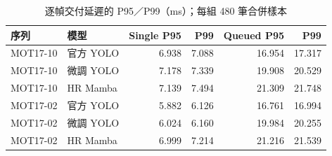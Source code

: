 \begin{table}[H]
\caption{逐幀交付延遲的 P95／P99（ms）；每組 480 筆合併樣本}
\small
\noindent\begin{tabularx}{\textwidth}{@{}P{21mm}Yrrrr@{}}
\toprule
序列 & 模型 & Single P95 & P99 & Queued P95 & P99 \\
\midrule
MOT17-10 & 官方 YOLO & 6.938 & 7.088 & 16.954 & 17.317 \\
MOT17-10 & 微調 YOLO & 7.178 & 7.339 & 19.908 & 20.529 \\
MOT17-10 & HR Mamba & 7.139 & 7.494 & 21.309 & 21.748 \\
MOT17-02 & 官方 YOLO & 5.882 & 6.126 & 16.761 & 16.994 \\
MOT17-02 & 微調 YOLO & 6.024 & 6.160 & 19.984 & 20.255 \\
MOT17-02 & HR Mamba & 6.999 & 7.214 & 21.216 & 21.539 \\
\bottomrule
\end{tabularx}
\end{table}
